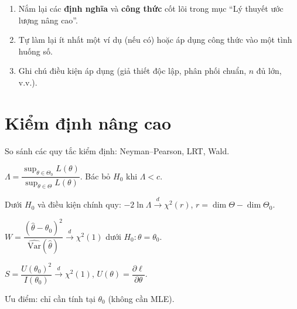 \documentclass[12pt,a4paper]{article}
\begin{document}

\begin{tongket}[title={Tổng kết: Lý thuyết ước lượng nâng cao}]
\begin{enumerate}
  \item Nắm lại các \textbf{định nghĩa} và \textbf{công thức} cốt lõi trong mục ``Lý thuyết ước lượng nâng cao''.
  \item Tự làm lại ít nhất một ví dụ (nếu có) hoặc áp dụng công thức vào một tình huống số.
  \item Ghi chú điều kiện áp dụng (giả thiết độc lập, phân phối chuẩn, $n$ đủ lớn, v.v.).
\end{enumerate}
\end{tongket}

\section{Kiểm định nâng cao}

\begin{dongco}[title={Động cơ --- Kiểm định nâng cao}]
So sánh các quy tắc kiểm định: Neyman--Pearson, LRT, Wald.
\end{dongco}

\begin{dinhly}[title={Kiểm định tỉ số hợp lý tổng quát (GLRT)}]
  $\Lambda = \dfrac{\sup_{\theta \in \Theta_0} L(\theta)}{\sup_{\theta \in \Theta} L(\theta)}$. Bác bỏ $H_0$ khi $\Lambda < c$.

  Dưới $H_0$ và điều kiện chính quy: $-2\ln\Lambda \xrightarrow{d} \chi^2(r)$, $r = \dim\Theta - \dim\Theta_0$.
\end{dinhly}

\begin{dinhly}[title={Kiểm định Wald}]
  $W = \dfrac{(\hat{\theta} - \theta_0)^2}{\widehat{\text{Var}}(\hat{\theta})} \xrightarrow{d} \chi^2(1)$ dưới $H_0: \theta = \theta_0$.
\end{dinhly}

\begin{dinhly}[title={Kiểm định Score (Rao)}]
  $S = \dfrac{U(\theta_0)^2}{I(\theta_0)} \xrightarrow{d} \chi^2(1)$, \;$U(\theta) = \dfrac{\partial \ell}{\partial \theta}$.

  Ưu điểm: chỉ cần tính tại $\theta_0$ (không cần MLE).
\end{dinhly}
\end{document}
